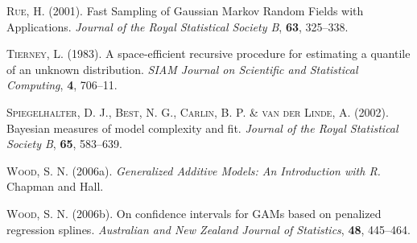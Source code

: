 \begin{thebibliography}{99}
 {\scshape Rue, H.} (2001).
 Fast Sampling of Gaussian Markov Random Fields with Applications.
 {\it Journal of the Royal Statistical Society B}, {\bf 63}, 325--338.

 {\scshape Tierney, L.} (1983).
 A space-efficient recursive procedure for estimating a quantile of an unknown distribution. 
 {\it SIAM Journal on Scientific and Statistical Computing}, {\bf 4}, 706--11.

 {\scshape Spiegelhalter, D. J., Best, N. G., Carlin, B. P. \& van der Linde, A.} (2002).
 Bayesian measures of model complexity and fit.
 {\it Journal of the Royal Statistical Society B}, {\bf 65}, 583--639.

 {\scshape Wood, S. N.} (2006a).
 {\it Generalized Additive Models: An Introduction with R.}
 Chapman and Hall.

 {\scshape Wood, S. N.} (2006b).
 On confidence intervals for GAMs based on penalized regression splines.
 {\it Australian and New Zealand Journal of Statistics}, {\bf 48}, 445--464.
\end{thebibliography}
